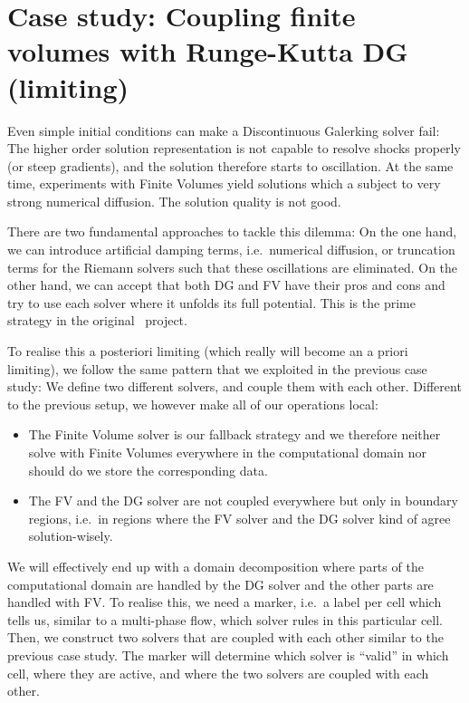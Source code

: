 \section{Case study: Coupling finite volumes with Runge-Kutta DG (limiting)}
\label{section:exahype:fv:limiting}


Even simple initial conditions can make a Discontinuous Galerking solver fail: 
The higher order solution representation is not capable to resolve shocks
properly (or steep gradients), and the solution therefore starts to oscillation.
At the same time, experiments with Finite Volumes yield solutions which a
subject to very strong numerical diffusion.
The solution quality is not good.


There are two fundamental approaches to tackle this dilemma: On the one hand,
we can introduce artificial damping terms, i.e.~numerical diffusion, or
truncation terms for the Riemann solvers such that these oscillations are
eliminated. 
On the other hand, we can accept that both DG and FV have their pros and cons
and try to use each solver where it unfolds its full potential.
This is the prime strategy in the original \ExaHyPE\ project.


To realise this a posteriori limiting (which really will become an a priori
limiting), we follow the same pattern that we exploited in the
previous case study:
We define two different solvers, and couple them with each other.
Different to the previous setup, we however make all of our operations local:

\begin{itemize}
  \item The Finite Volume solver is our fallback strategy and we therefore
  neither solve with Finite Volumes everywhere in the computational domain nor
  should do we store the corresponding data.
  \item The FV and the DG solver are not coupled everywhere but only in boundary
  regions, i.e.~in regions where the FV solver and the DG solver kind of agree
  solution-wisely.
\end{itemize}


\noindent
We will effectively end up with a domain decomposition where parts of the
computational domain are handled by the DG solver and the other parts are
handled with FV.
To realise this, we need a marker, i.e.~a
label per cell which tells us, similar to a multi-phase flow, which solver rules in this
particular cell.
Then, we construct two solvers that are coupled with each other similar to the
previous case study.
The marker will determine which solver is ``valid'' in which cell, where they
are active, and where the two solvers are coupled with each other.


